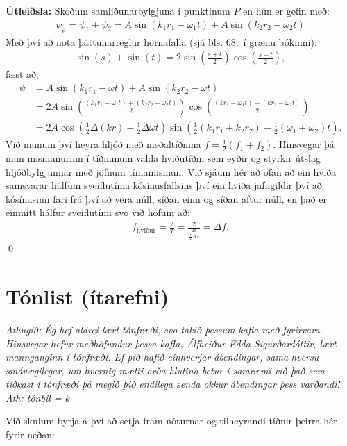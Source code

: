 \textbf{Útleiðsla:} Skoðum samliðunarbylgjuna í punktinum $P$ en hún er gefin með:
\begin{align*}
    \psi_{_\text{P}} = \psi_1 + \psi_2 = A \sin(k_1 r_1 - \omega_1 t) +  A \sin(k_2 r_2 - \omega_2 t)
\end{align*}
Með því að nota þáttunarreglur hornafalla (sjá bls. 68.~í grænu bókinni):
\begin{align*}
    \sin(s) + \sin(t) = 2\sin(\frac{s+t}{2})\cos(\frac{s-t}{2}),
\end{align*}
fæst að:
\vspace{-0.75cm}
\begin{align*}
    \psi &= A \sin(k_1 r_1 - \omega t) +  A \sin(k_2 r_2 - \omega t) \\
    &= 2A\sin(\frac{\left(k_1r_1 - \omega_1 t\right) + \left(k_2 r_2 -\omega_2 t\right)}{2})\cos(\frac{\left( k r_1 - \omega_1 t \right) - \left( kr_2 - \omega_2 t \right)}{2}) \\
    &= 2A\cos(\frac{1}{2}\Delta(kr) - \frac{1}{2}\Delta \omega t)\sin(\frac{1}{2}(k_1r_1+k_2r_2)-\frac{1}{2}(\omega_1+\omega_2) t).
\end{align*}
Við munum því heyra hljóð með meðaltíðnina $f = \frac{1}{2}(f_1 + f_2)$. Hinsvegar þá mun mismunurinn í tíðnunum valda hviðutíðni sem eyðir og styrkir útslag hljóðbylgjunnar með jöfnum tímamismun. Við sjáum hér að ofan að ein hviða samsvarar hálfum sveiflutíma kósínusfallsins því ein hviða jafngildir því að kósínusinn fari frá því að vera núll, síðan einn og síðan aftur núll, en það er einmitt hálfur sveiflutími svo við höfum að:
\begin{align*}
    f_{\text{hviður}} = \frac{2}{T} = \frac{2}{\frac{2\pi}{\frac{1}{2}\Delta \omega}} = \Delta f.
\end{align*}
\qed


\newpage

\section{Tónlist (ítarefni)} 

\textit{Athugið: Ég hef aldrei lært tónfræði, svo takið þessum kafla með fyrirvara. Hinsvegar hefur meðhöfundur þessa kafla, Álfheiður Edda Sigurðardóttir, lært mannganginn í tónfræði. Ef þið hafið einhverjar ábendingar, sama hversu smávægilegar, um hvernig mætti orða hlutina betur í samræmi við það sem tíðkast í tónfræði þá megið þið endilega senda okkur ábendingar þess varðandi! Ath: tónbil = k}


Við skulum byrja á því að setja fram nóturnar og tilheyrandi tíðnir þeirra hér fyrir neðan:


